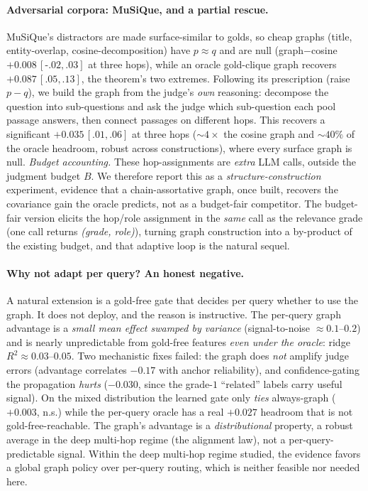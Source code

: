 \documentclass[twoside]{article}
\theoremstyle{plain}
\theoremstyle{definition}
\begin{document}
\paragraph{Adversarial corpora: MuSiQue, and a partial rescue.} MuSiQue's distractors are made surface-similar to
golds, so cheap graphs (title, entity-overlap, cosine-decomposition) have $p\approx q$ and are null (graph$-$cosine
$+0.008\,[\text{-}.02,.03]$ at three hops), while an oracle gold-clique graph recovers $+0.087\,[.05,.13]$, the
theorem's two extremes. Following its prescription (raise $p-q$), we build the graph from the judge's \emph{own}
reasoning: decompose the question into sub-questions and ask the judge which sub-question each pool passage
answers, then connect passages on different hops. This recovers a significant $+0.035\,[.01,.06]$ at three
hops ($\sim4\times$ the cosine graph and $\sim40\%$ of the oracle headroom, robust across constructions), where
every surface graph is null. \emph{Budget accounting.} These hop-assignments are \emph{extra} LLM calls, outside
the judgment budget $B$. We therefore report this as a \emph{structure-construction} experiment, evidence that a
chain-assortative graph, once built, recovers the covariance gain the oracle predicts, not as a budget-fair
competitor. The budget-fair version elicits the hop/role assignment in the \emph{same} call as the relevance grade
(one call returns \emph{(grade, role)}), turning graph construction into a by-product of the existing budget, and
that adaptive loop is the natural sequel.

\paragraph{Why not adapt per query? An honest negative.} A natural extension is a gold-free gate that decides per
query whether to use the graph. It does not deploy, and the reason is instructive. The per-query graph advantage is
a \emph{small mean effect swamped by variance} (signal-to-noise $\approx0.1$--$0.2$) and is nearly unpredictable
from gold-free features \emph{even under the oracle}: ridge $R^2\approx0.03$--$0.05$. Two mechanistic fixes failed:
the graph does \emph{not} amplify judge errors (advantage correlates $-0.17$ with anchor reliability), and
confidence-gating the propagation \emph{hurts} ($-0.030$, since the grade-$1$ ``related'' labels carry useful signal).
On the mixed distribution the learned gate only \emph{ties} always-graph ($+0.003$, n.s.) while the per-query
oracle has a real $+0.027$ headroom that is not gold-free-reachable. The graph's advantage is a \emph{distributional}
property, a robust average in the deep multi-hop regime (the alignment law), not a per-query-predictable signal.
Within the deep multi-hop regime studied, the evidence favors a global graph policy over per-query routing, which
is neither feasible nor needed here.
\end{document}
